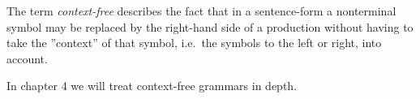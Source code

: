 The term {\em context-free} describes the fact that in a sentence-form a
nonterminal symbol may be replaced by the right-hand side of a production
without having to take the ''context'' of that symbol, i.e.\ the symbols to the
left or right, into account.

In chapter 4 we will treat context-free grammars in depth.





























